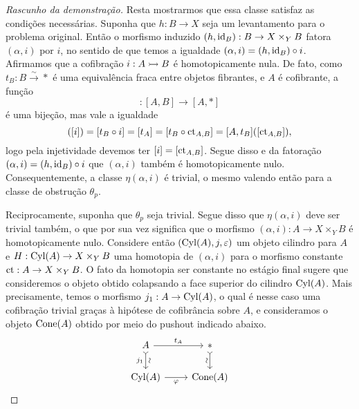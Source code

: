 \begin{proof}[Rascunho da demonstração]
  Resta mostrarmos que essa classe satisfaz as condições necessárias.
  Suponha que $h: B \to X$ seja um levantamento para o problema original.
  Então o morfismo induzido $(h,\mathrm{id}_{B}): B \to X \times_{Y} B$ fatora $(\alpha,i)$ por $i$, no sentido de que temos a igualdade $(\alpha,i) = (h,\mathrm{id}_{B}) \circ i$.
  Afirmamos que a cofibração $i: A \rightarrowtail B$ é homotopicamente nula.
  De fato, como $t_{B}: B \overset{\sim}{\to} *$ é uma equivalência fraca entre objetos fibrantes, e $A$ é cofibrante, a função
  \begin{displaymath}
    [A,t_{B}]: [A,B] \to [A,*]
  \end{displaymath}
  é uma bijeção, mas vale a igualdade
  \begin{displaymath}
    [A,t_{B}]([i]) = [t_{B} \circ i] = [t_{A}] = [t_{B} \circ \ct_{A,B}] = [A,t_{B}]([\ct_{A,B}]),
  \end{displaymath}
  logo pela injetividade devemos ter $[i] = [\mathrm{ct}_{A,B}]$.
  Segue disso e da fatoração $(\alpha,i) = (h,\mathrm{id}_{B}) \circ i$ que $(\alpha,i)$ também é homotopicamente nulo.
  Consequentemente, a classe $\eta(\alpha,i)$ é trivial, o mesmo valendo então para a classe de obstrução $\theta_{p}$.

  Reciprocamente, suponha que $\theta_{p}$ seja trivial.
  Segue disso que $\eta(\alpha,i)$ deve ser trivial também, o que por sua vez significa que o morfismo $(\alpha,i): A \to X \times_{Y} B$ é homotopicamente nulo.
  Considere então $(\mathrm{Cyl}(A),j,\varepsilon)$ um objeto cilindro para $A$ e $H: \mathrm{Cyl}(A) \to X \times_{Y} B$ uma homotopia de $(\alpha,i)$ para o morfismo constante $\mathrm{ct}: A \to X \times_{Y} B$.
  O fato da homotopia ser constante no estágio final sugere que consideremos o objeto obtido colapsando a face superior do cilindro $\mathrm{Cyl}(A)$.
  Mais precisamente, temos o morfismo $j_{1}: A \to \mathrm{Cyl}(A)$, o qual é nesse caso uma cofibração trivial graças à hipótese de cofibrância sobre $A$, e consideramos o objeto $\mathrm{Cone}(A)$ obtido por meio do pushout indicado abaixo.
  \begin{displaymath}
    \begin{tikzcd}
      A
      \arrow[r, "t_{A}"]
      \arrow[d, tail, "j_{1}" {swap}, "\sim" {sloped}]
      & *
      \arrow[d, tail, "\sim" {swap,sloped}]
      \\ \Cyl(A)
      \arrow[r, "\varphi" swap]
      & \Cone(A)
    \end{tikzcd}
  \end{displaymath}


\end{proof}
